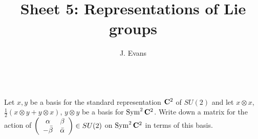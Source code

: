 \documentclass[12pt]{article}
\title{Sheet 5: Representations of Lie groups}
\author{J. Evans}
\date{}
\begin{document}
\maketitle

\begin{question}\ \\
Let $x,y$ be a basis for the standard representation $\mathbf{C}^2$ of $SU(2)$ and let $x\otimes x$, $\frac{1}{2}(x\otimes y+y\otimes x)$, $y\otimes y$ be a basis for $\operatorname{Sym}^2\mathbf{C}^2$. Write down a matrix for the action of $\left(\begin{array}{cc}\alpha & \beta\\ -\bar{\beta} & \bar{\alpha}\end{array}\right)\in SU(2)$ on $\operatorname{Sym}^2\mathbf{C}^2$ in terms of this basis.
\end{question}

\iffalse
\begin{answer}
We have
\begin{align*}
\OP{Sym}^2\matr{\alpha}{\beta}{-\bar{\beta}}{\bar{\alpha}}(x\otimes x)&=(\alpha x-\bar{\beta} y)\otimes(\alpha x-\bar{\beta} y)\\
&=\alpha^2(x\otimes x)-2\alpha\bar{\beta}\left(\frac{x\otimes y+y\otimes x}{2}\right)+\bar{\beta}^2y\otimes y\\
\OP{Sym}^2\matr{\alpha}{\beta}{-\bar{\beta}}{\bar{\alpha}}(y\otimes y)&=(\beta x+\bar{\alpha} y)\otimes(\beta x+\bar{\alpha} y)\\
&=\beta^2x\otimes x+2\bar{\alpha}\beta\left(\frac{x\otimes y+y\otimes x}{2}\right)+\bar{\alpha}^2y\otimes y
\end{align*}
and
\begin{align*}
\OP{Sym}^2\matr{\alpha}{\beta}{-\bar{\beta}}{\bar{\alpha}}\left(\frac{x\otimes y+y\otimes x}{2}\right)&=\frac{1}{2}(\alpha x-\bar{\beta} y)\otimes(\beta x+\bar{\alpha}y)+\frac{1}{2}({\beta}x+\bar{\alpha}y)\otimes(\alpha x-\bar{\beta} y)\\
&=\alpha{\beta}x\otimes x+(|\alpha|^2-|\beta|^2)\left(\frac{x\otimes y+y\otimes x}{2}\right)-\bar{\alpha}\bar{\beta} y\otimes y
\end{align*}
so the matrix is
\[\matt{\alpha^2}{\alpha{\beta}}{{\beta}^2}{-2\alpha\bar{\beta}}{|\alpha|^2-|\beta|^2}{2\bar{\alpha}\beta}{\bar{\beta}^2}{-\bar{\alpha}\bar{\beta}}{\bar{\alpha}^2}.\]
\end{answer}
\newpage
\fi


\bigskip
\end{document}
